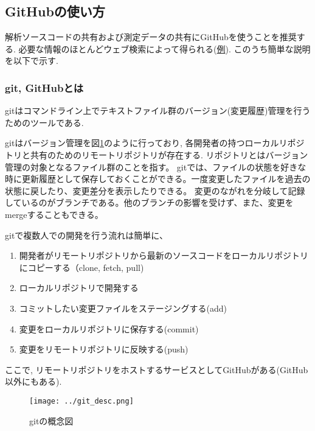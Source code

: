 \subsection{GitHubの使い方}
解析ソースコードの共有および測定データの共有にGitHubを使うことを推奨する.
必要な情報のほとんどウェブ検索によって得られる(\href{https://tech-blog.rakus.co.jp/entry/20200529/git}{例}). 
このうち簡単な説明を以下で示す.

\subsubsection{git, GitHubとは}
gitはコマンドライン上でテキストファイル群のバージョン(変更履歴)管理を行うためのツールである.

gitはバージョン管理を図\ref{fig:git_desc}のように行っており, 各開発者の持つローカルリポジトリと共有のためのリモートリポジトリが存在する\cite{github}.
リポジトリとはバージョン管理の対象となるファイル群のことを指す。
gitでは、ファイルの状態を好きな時に更新履歴として保存しておくことができる。一度変更したファイルを過去の状態に戻したり、変更差分を表示したりできる。
変更のながれを分岐して記録しているのがブランチである。他のブランチの影響を受けず、また、変更をmergeすることもできる。

gitで複数人での開発を行う流れは簡単に、
\begin{enumerate}
\item 開発者がリモートリポジトリから最新のソースコードをローカルリポジトリにコピーする（clone, fetch, pull)
\item ローカルリポジトリで開発する
\item コミットしたい変更ファイルをステージングする(add)
\item 変更をローカルリポジトリに保存する(commit)
\item 変更をリモートリポジトリに反映する(push)
\end{enumerate}
ここで, リモートリポジトリをホストするサービスとしてGitHubがある(GitHub以外にもある).
\begin{figure}[h]
    \centering
    \texttt{[image: ../git\_desc.png]}
    \caption{gitの概念図\cite{github}}
    \label{fig:git_desc}
\end{figure}

